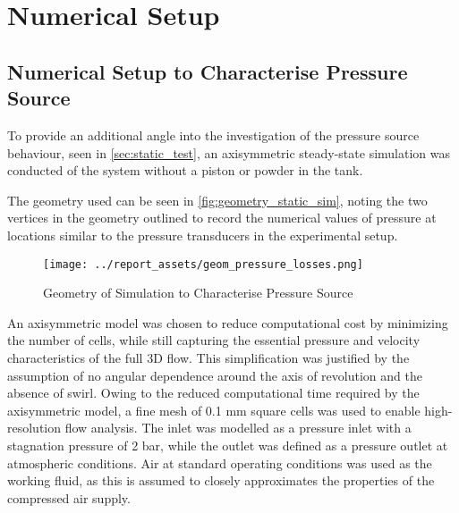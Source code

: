 \section{Numerical Setup}\label{sec:numerical-setup}
\subsection{Numerical Setup to Characterise Pressure Source}
To provide an additional angle into the investigation of the pressure source behaviour, seen in \autoref{sec:static_test}, an axisymmetric steady-state simulation was conducted of the system without a piston or powder in the tank. 

The geometry used can be seen in \autoref{fig:geometry_static_sim}, noting the two vertices in the geometry outlined to record the numerical values of pressure at locations similar to the pressure transducers in the experimental setup.
\begin{figure}[htbp]
    \centering
    
    \begin{minipage}{0.9\textwidth}
        \centering
        \texttt{[image: ../report\_assets/geom\_pressure\_losses.png]}
        \caption{Geometry of Simulation to Characterise Pressure Source}\label{fig:geometry_static_sim}
    \end{minipage}
    
\end{figure}
An axisymmetric model was chosen to reduce computational cost by minimizing the number of cells, while still capturing the essential pressure and velocity characteristics of the full 3D flow. This simplification was justified by the assumption of no angular dependence around the axis of revolution and the absence of swirl. Owing to the reduced computational time required by the axisymmetric model, a fine mesh of 0.1 mm square cells was used to enable high-resolution flow analysis. The inlet was modelled as a pressure inlet with a stagnation pressure of 2 bar, while the outlet was defined as a pressure outlet at atmospheric conditions. Air at standard operating conditions was used as the working fluid, as this is assumed to closely approximates the properties of the compressed air supply.
